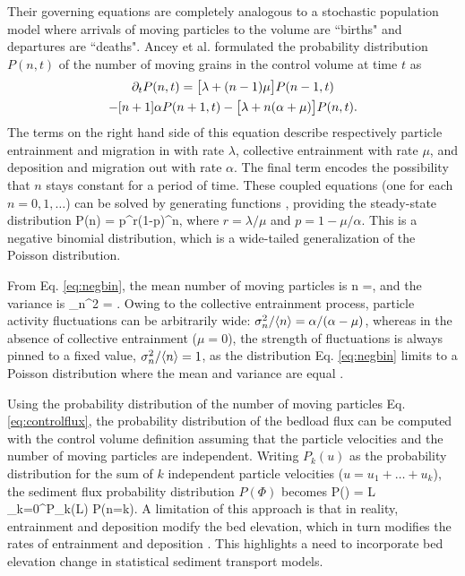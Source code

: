 Their governing equations are completely analogous to a stochastic population model \citep{Cox1965, Pielou1977} where arrivals of moving particles to the volume are ``births" and departures are ``deaths".
Ancey et al. formulated the probability distribution $P(n,t)$ of the number of moving grains in the control volume at time $t$ as
\begin{multline} \partial_t P(n,t) = \big[\lambda + (n-1)\mu\big] P(n-1,t) \\ - [n+1]\alpha P(n+1,t) - \big[\lambda + n (\alpha + \mu)\big]P(n,t).\end{multline}
The terms on the right hand side of this equation describe respectively particle entrainment and migration in with rate $\lambda$, collective entrainment with rate $\mu$, and deposition and migration out with rate $\alpha$.
The final term encodes the possibility that $n$ stays constant for a period of time.
These coupled equations (one for each $n=0,1,\dots$) can be solved by generating functions \citep{Cox1965}, providing the steady-state distribution
\be P(n) = p^r(1-p)^n, \label{eq:negbin}\ee
where $r = \lambda/\mu$ and $p = 1-\mu/\alpha$.
This is a negative binomial distribution, which is a wide-tailed generalization of the Poisson distribution.

From Eq. \ref{eq:negbin}, the mean number of moving particles is 
\be \langle n \rangle =\frac{ \lambda}{\alpha-\mu},\ee
 and the variance is
\be \sigma_n^2 = . \ee
Owing to the collective entrainment process, particle activity fluctuations can be arbitrarily wide: $\sigma_n^2/\langle n \rangle = \alpha/(\alpha-\mu)$, whereas in the absence of collective entrainment ($\mu=0$), the strength of fluctuations is always pinned to a fixed value, $\sigma_n^2/\langle n\rangle = 1$, as the distribution Eq. \ref{eq:negbin} limits to a Poisson distribution where the mean and variance are equal \citep[e.g.][]{Ancey2006}.

Using the probability distribution of the number of moving particles Eq. \ref{eq:controlflux}, the probability distribution of the bedload flux can be computed with the control volume definition assuming that the particle velocities and the number of moving particles are independent.
Writing $P_k(u)$ as the probability distribution for the sum of $k$ independent particle velocities ($u=u_1+\dots+u_k$), the sediment flux probability distribution $P(\Phi)$ becomes \citep{Ancey2020a}
\be P(\Phi) = L \sum_{k=0}^\infty P_k(L\Phi) P(n=k). \ee
A limitation of this approach is that in reality, entrainment and deposition modify the bed elevation, which in turn modifies the rates of entrainment and deposition \citep{Sawai1987,Wong2007}. 
This highlights a need to incorporate bed elevation change in statistical sediment transport models.

